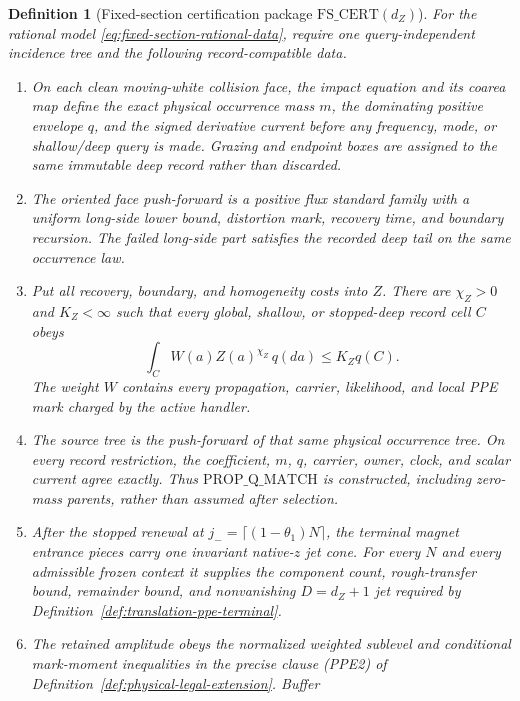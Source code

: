 \documentclass[11pt]{article}
\newtheorem{definition}[theorem]{Definition}
\begin{document}
\begin{definition}[Fixed-section certification package
$\mathrm{FS\_CERT}(d_Z)$]
\label{def:fixed-section-cert}
For the rational model \eqref{eq:fixed-section-rational-data}, require one
query-independent incidence tree and the following record-compatible data.
\begin{enumerate}[label=\textup{(FS\arabic*)}]
\item On each clean moving-white collision face, the impact equation and its
coarea map define the exact physical occurrence mass $m$, the dominating
positive envelope $q$, and the signed derivative current before any
frequency, mode, or shallow/deep query is made.  Grazing and endpoint boxes
are assigned to the same immutable deep record rather than discarded.
\item The oriented face push-forward is a positive flux standard family
with a uniform long-side lower bound, distortion mark, recovery time, and
boundary recursion.  The failed long-side part satisfies the recorded deep
tail on the same occurrence law.
\item Put all recovery, boundary, and homogeneity costs into $Z$.  There are
$\chi_Z>0$ and $K_Z<\infty$ such that every global, shallow, or
stopped-deep record cell $C$ obeys
\begin{equation}
 \int_C W(a)Z(a)^{\chi_Z}\,q(da)
 \le K_Z q(C).
\label{eq:fixed-section-hereditary-Z}
\end{equation}
The weight $W$ contains every propagation, carrier, likelihood, and local
PPE mark charged by the active handler.
\item The source tree is the push-forward of that same physical occurrence
tree.  On every record restriction, the coefficient, $m$, $q$, carrier,
owner, clock, and scalar current agree exactly.  Thus
$\mathrm{PROP\_Q\_MATCH}$ is constructed, including zero-mass parents,
rather than assumed after selection.
\item After the stopped renewal at
$j_- =\lceil(1-\theta_1)N\rceil$, the terminal magnet entrance pieces carry
one invariant native-$z$ jet cone.  For every $N$ and every admissible frozen
context it supplies the component count, rough-transfer bound, remainder
bound, and nonvanishing $D=d_Z+1$ jet required by
Definition~\ref{def:translation-ppe-terminal}.
\item The retained amplitude obeys the normalized weighted sublevel and
conditional mark-moment inequalities in the precise clause \textup{(PPE2)}
of Definition~\ref{def:physical-legal-extension}.  Buffer

\end{enumerate}
\end{definition}
\end{document}
